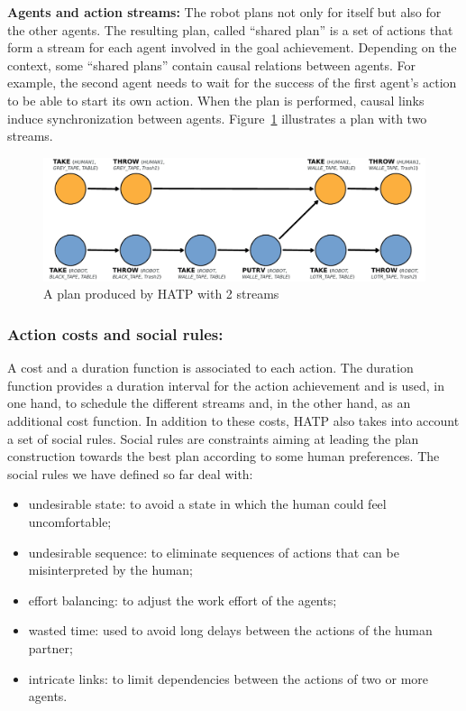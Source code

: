 \documentclass{svmult}
\begin{document}
\vspace{0.3cm}
\noindent
\textbf{Agents and action streams:}
The robot plans not only for itself but also for the other agents. The
resulting plan, called ``shared plan'' is a set of actions that form
a stream for each agent involved in the goal achievement. Depending on
the context, some ``shared plans'' contain causal relations between
agents. For example, the second agent needs to wait for the success of
the first agent's action to be able to start its own action. When the
plan is performed, causal links induce synchronization between
agents. Figure~\ref{plan_hatp1} illustrates a plan with two streams.

\begin{figure}[htbp]
  \centering
  \includegraphics[width=0.95\columnwidth]{./figs/plan1.pdf}
  \caption{A plan produced by HATP with 2 streams}
  \label{plan_hatp1}
\end{figure}

\subsubsection{Action costs and social rules:}
A cost and a duration function is associated to each action.
The duration function provides a duration interval for the action
achievement and is used, in one hand, to schedule the different
streams and, in the other hand, as an additional cost function.
In addition to these costs, HATP also takes into account a set of social
rules.  Social rules are constraints aiming at leading the plan
construction towards the best plan according to some human
preferences. The social rules we have defined so far deal with:

\begin{itemize}
\item undesirable state: to avoid a state in which the human could
  feel uncomfortable;
\item undesirable sequence: to eliminate sequences of actions that can
  be misinterpreted by the human;
\item effort balancing: to adjust the work effort of the agents;
\item wasted time: used to avoid long delays between the actions of
  the human partner;
\item intricate links: to limit dependencies between the actions of
  two or more agents.
\end{itemize}
\end{document}
